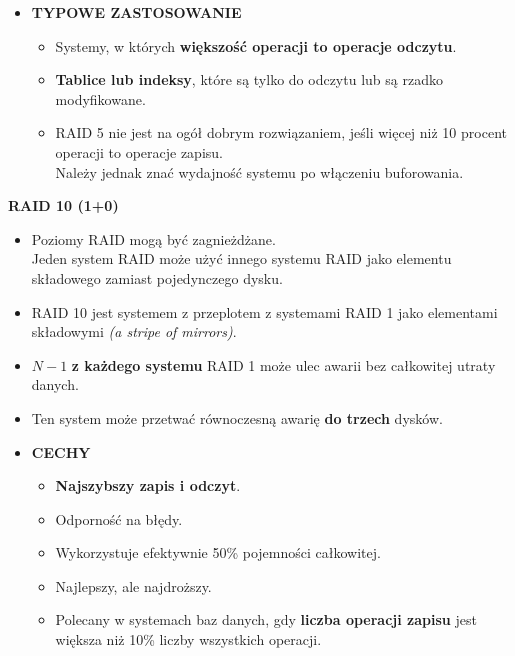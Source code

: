 \begin{itemize}
    \item \textbf{TYPOWE ZASTOSOWANIE}
    \begin{itemize}
        \item Systemy, w których
              \textbf{większość operacji to operacje odczytu}.
        \item \textbf{Tablice lub indeksy}, które są tylko do odczytu lub
              są rzadko modyfikowane.
        \item RAID 5 nie jest na ogół dobrym rozwiązaniem, jeśli więcej niż
              10 procent operacji to operacje zapisu.\\
              Należy jednak znać wydajność systemu po włączeniu buforowania.
    \end{itemize}
\end{itemize}

\textbf{RAID 10 (1+0)}
\begin{itemize}
    \item Poziomy RAID mogą być zagnieżdżane.\\
          Jeden system RAID może użyć innego systemu RAID jako elementu
          składowego zamiast pojedynczego dysku.
    \item RAID 10 jest systemem z przeplotem z systemami RAID 1 jako
          elementami składowymi \textit{(a stripe of mirrors)}.
    \item $N - 1$ \textbf{z każdego systemu} RAID 1 może ulec awarii
          bez całkowitej utraty danych.
\end{itemize}

\begin{center}
\end{center}

\begin{itemize}
    \item Ten system może przetwać równoczesną awarię \textbf{do trzech}
          dysków.\\

    \item \textbf{CECHY}
    \begin{itemize}
        \item \textbf{Najszybszy zapis i odczyt}.
        \item Odporność na błędy.
        \item Wykorzystuje efektywnie 50\% pojemności całkowitej.
        \item Najlepszy, ale najdroższy.
        \item Polecany w systemach baz danych, gdy
              \textbf{liczba operacji zapisu}
              jest \\większa niż 10\% liczby wszystkich operacji.
    \end{itemize}
\end{itemize}

